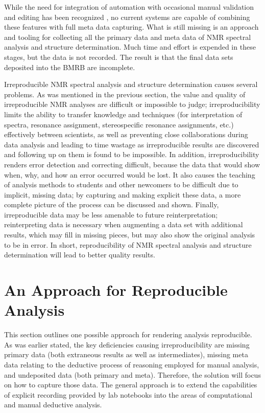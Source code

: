 While the need for integration of automation with occasional manual 
validation and editing has been recognized \cite{baran2006spins}, no 
current systems are capable of combining these features with full 
meta data capturing.  
What is still missing is an approach and tooling for collecting all the primary 
data and meta data of NMR spectral analysis and structure determination.  Much 
time and effort is expended in these stages, but the data is not recorded.  The 
result is that the final data sets deposited into the BMRB are incomplete.

Irreproducible NMR spectral analysis and structure determination causes 
several problems.  As was mentioned in the previous section, the value and 
quality of irreproducible NMR analyses are difficult or impossible to judge; 
irreproducibility limits the ability to transfer knowledge and techniques 
(for interpretation of spectra, resonance assignment, stereospecific resonance 
assignments, etc.) effectively between scientists, as well as preventing close 
collaborations during data analysis and leading to time wastage as 
irreproducible results are discovered and following up on them is found to be 
impossible.  In addition, irreproducibility renders error detection and 
correcting difficult, because the data that would show when, why, and how an 
error occurred would be lost.  It also causes the teaching of analysis methods 
to students and other newcomers to be difficult due to implicit, missing data; 
by capturing and making explicit these data, a more complete picture of the 
process can be discussed and shown.  Finally, irreproducible data may be less 
amenable to future reinterpretation; reinterpreting data is necessary when 
augmenting a data set with additional results, which may fill in missing 
pieces, but may also show the original analysis to be in error.  In short, 
reproducibility of NMR spectral analysis and structure determination will lead 
to better quality results.


\section{An Approach for Reproducible Analysis}
This section outlines one possible approach for rendering analysis reproducible.
As was earlier stated, the key deficiencies causing irreproducibility are 
missing primary data (both extraneous results as well as intermediates), 
missing meta data relating to the deductive process of reasoning employed 
for manual analysis, and undeposited data (both primary and meta).  Therefore, 
the solution will focus on how to capture those data.  The general approach
is to extend the capabilities of explicit recording provided by lab notebooks
into the areas of computational and manual deductive analysis.

